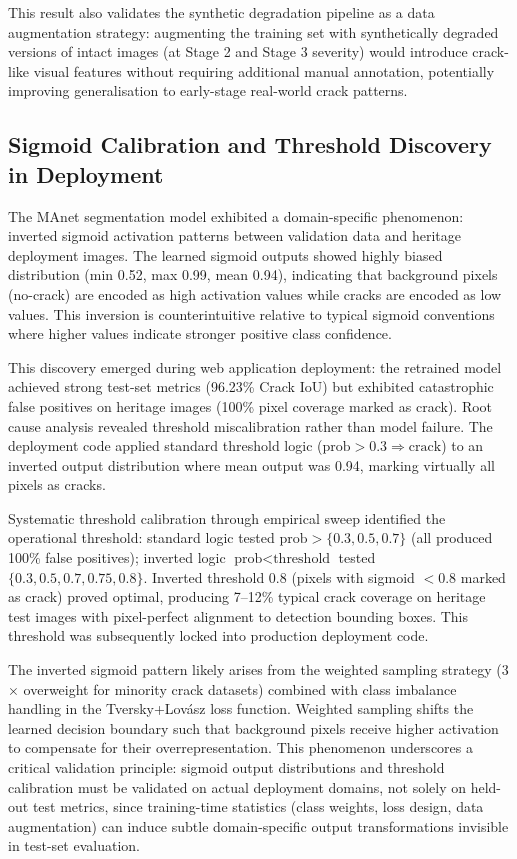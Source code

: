 \documentclass[12pt,a4paper]{article}
\begin{document}
This result also validates the synthetic degradation pipeline as a data augmentation strategy: augmenting the training set with synthetically degraded versions of intact images (at Stage 2 and Stage 3 severity) would introduce crack-like visual features without requiring additional manual annotation, potentially improving generalisation to early-stage real-world crack patterns.

\subsection{Sigmoid Calibration and Threshold Discovery in Deployment}
\label{sec:sigmoid_cal}

The MAnet segmentation model exhibited a domain-specific phenomenon: inverted sigmoid activation patterns between validation data and heritage deployment images. The learned sigmoid outputs showed highly biased distribution (min 0.52, max 0.99, mean 0.94), indicating that background pixels (no-crack) are encoded as high activation values while cracks are encoded as low values. This inversion is counterintuitive relative to typical sigmoid conventions where higher values indicate stronger positive class confidence.

This discovery emerged during web application deployment: the retrained model achieved strong test-set metrics (96.23\% Crack IoU) but exhibited catastrophic false positives on heritage images (100\% pixel coverage marked as crack). Root cause analysis revealed threshold miscalibration rather than model failure. The deployment code applied standard threshold logic ($\text{prob} > 0.3 \Rightarrow \text{crack}$) to an inverted output distribution where mean output was 0.94, marking virtually all pixels as cracks.

Systematic threshold calibration through empirical sweep identified the operational threshold: standard logic tested $\text{prob} > \{0.3, 0.5, 0.7\}$ (all produced 100\% false positives); inverted logic $\text{prob} < \text{threshold}$ tested $\{0.3, 0.5, 0.7, 0.75, 0.8\}$. Inverted threshold 0.8 (pixels with sigmoid $< 0.8$ marked as crack) proved optimal, producing 7--12\% typical crack coverage on heritage test images with pixel-perfect alignment to detection bounding boxes. This threshold was subsequently locked into production deployment code.

The inverted sigmoid pattern likely arises from the weighted sampling strategy (3$\times$ overweight for minority crack datasets) combined with class imbalance handling in the Tversky+Lovász loss function. Weighted sampling shifts the learned decision boundary such that background pixels receive higher activation to compensate for their overrepresentation. This phenomenon underscores a critical validation principle: sigmoid output distributions and threshold calibration must be validated on actual deployment domains, not solely on held-out test metrics, since training-time statistics (class weights, loss design, data augmentation) can induce subtle domain-specific output transformations invisible in test-set evaluation.
\end{document}
